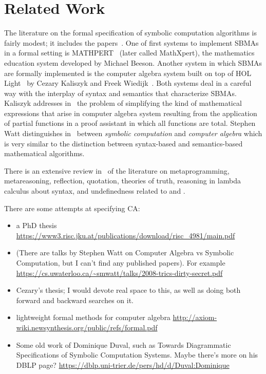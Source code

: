 \documentclass[fleqn]{llncs}
\begin{document}
\section{Related Work}\label{sec:related-work}

The literature on the formal specification of symbolic computation
algorithms is fairly modest; it includes the
papers~\cite{DunstanEtAl98,Khan14,KhanSchreiner12,LimongelliTemperini92}.
One of first systems to implement SBMAs in a formal setting is
MATHPERT~\cite{Beeson89} (later called MathXpert), the mathematics
education system developed by Michael Beeson.  Another system in which
SBMAs are formally implemented is the computer algebra system built on
top of HOL Light~\cite{Harrison09} by Cezary Kaliszyk and Freek
Wiedijk~\cite{KaliszykWiedijk07}.  Both systems deal in a careful way
with the interplay of syntax and semantics that characterize SBMAs.
Kaliszyk addresses in~\cite{Kaliszyk08} the problem of simplifying the
kind of mathematical expressions that arise in computer algebra system
resulting from the application of partial functions in a proof
assistant in which all functions are total.  Stephen Watt
distinguishes in~\cite{Watt06} between \emph{symbolic computation} and
\emph{computer algebra} which is very similar to the distinction
between syntax-based and semantics-based mathematical algorithms.

There is an extensive review in~\cite{Farmer18} of the literature on
metaprogramming, metareasoning, reflection, quotation, theories of
truth, reasoning in lambda calculus about syntax, and undefinedness
related to {\churchqe} and {\churchuqe}.

\iffalse

There are some attempts at specifying CA:
\begin{itemize}
\item a PhD thesis 
\url{https://www3.risc.jku.at/publications/download/risc_4981/main.pdf}
\item (There are talks by Stephen Watt on Computer Algebra vs Symbolic
Computation, but I can't find any published papers). For example
\url{https://cs.uwaterloo.ca/~smwatt/talks/2008-trics-dirty-secret.pdf}
\item Cezary's thesis; I would devote real space to this, as well as doing
both forward and backward searches on it.
\item lightweight formal methods for computer algebra
\url{http://axiom-wiki.newsynthesis.org/public/refs/formal.pdf}
\item Some old work of Dominique Duval, such as
Towards Diagrammatic Specifications of Symbolic Computation Systems.
Maybe there's more on his DBLP page?
\url{https://dblp.uni-trier.de/pers/hd/d/Duval:Dominique}
\end{itemize}
\end{document}
